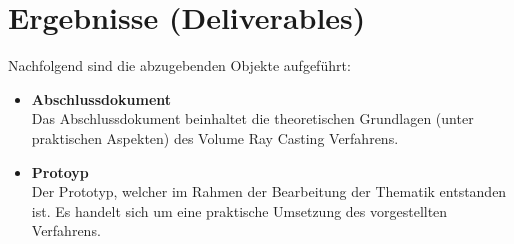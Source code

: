 \section{Ergebnisse (Deliverables)}
\label{sec:deliverables}

Nachfolgend sind die abzugebenden Objekte aufgeführt:
\begin{itemize}
    \item \textbf{Abschlussdokument} \\
        Das Abschlussdokument beinhaltet die theoretischen Grundlagen
        (unter praktischen Aspekten) des Volume Ray Casting Verfahrens.
    \item \textbf{Protoyp} \\
        Der Prototyp, welcher im Rahmen der Bearbeitung der Thematik
        entstanden ist. Es handelt sich um eine praktische Umsetzung des
        vorgestellten Verfahrens.
\end{itemize}
